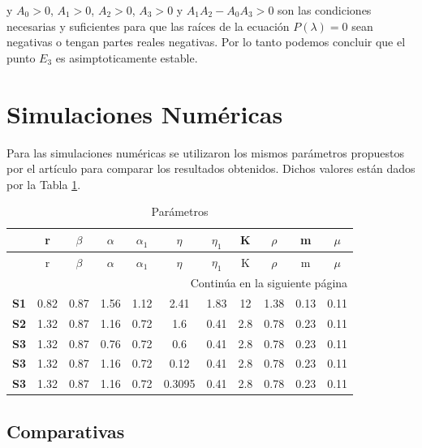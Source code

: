 \documentclass{wscpaperproc}
\theoremstyle{wsc}
\begin{document}
y $A_0 > 0$, $A_1 > 0$, $A_2 > 0$, $A_3 > 0$ y $A_1 A_2 - A_0 A_3 > 0$ son las condiciones necesarias y suficientes
para que las raíces de la ecuación $P(\lambda) = 0$ sean negativas o tengan partes reales negativas. Por lo tanto podemos 
concluir que el punto $E_3$ es asimptoticamente estable.
\section{Simulaciones Numéricas}
Para las simulaciones numéricas se utilizaron los mismos parámetros propuestos por el artículo para comparar los resultados obtenidos.
Dichos valores están dados por la Tabla \ref{tab:first}.


\begin{longtable}{rcccccccccc}
	\caption{Par\'ametros\label{tab:first}}                                                                \\
	\hline
	            & r    & $\beta$ & $\alpha$ & $\alpha_1$ & $\eta$ & $\eta_1$ & K   & $\rho$ & m    & $\mu$ \\ \hline
	\endfirsthead
	\hline
	            & r    & $\beta$ & $\alpha$ & $\alpha_1$ & $\eta$ & $\eta_1$ & K   & $\rho$ & m    & $\mu$ \\ \hline
	\endhead
	\hline
	\multicolumn{11}{|r|}{{Continúa en la siguiente página}}                                               \\ \hline
	\endfoot
	\hline
	\endlastfoot
	\textbf{S1} & 0.82 & 0.87    & 1.56     & 1.12       & 2.41   & 1.83     & 12  & 1.38   & 0.13 & 0.11  \\
	\textbf{S2} & 1.32 & 0.87    & 1.16     & 0.72       & 1.6    & 0.41     & 2.8 & 0.78   & 0.23 & 0.11  \\
	\textbf{S3} & 1.32 & 0.87    & 0.76     & 0.72       & 0.6    & 0.41     & 2.8 & 0.78   & 0.23 & 0.11  \\
	\textbf{S3} & 1.32 & 0.87    & 1.16     & 0.72       & 0.12   & 0.41     & 2.8 & 0.78   & 0.23 & 0.11  \\
	\textbf{S3} & 1.32 & 0.87    & 1.16     & 0.72       & 0.3095 & 0.41     & 2.8 & 0.78   & 0.23 & 0.11  \\
\end{longtable}

\subsection{Comparativas}
\end{document}
